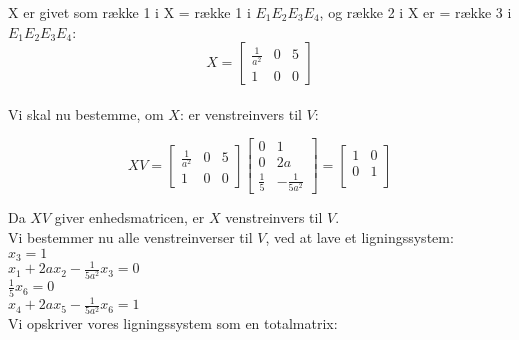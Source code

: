\documentclass[a4paper,12pt]{article}
\begin{document}
X er givet som række 1 i X = række 1 i $E_1 E_2 E_3 E_4$, og række 2 i X er = række 3 i $E_1 E_2 E_3 E_4$:\\
\[
X =
\left[\begin{array}{ccc}
    \frac{1}{a^2} & 0 & 5 \\
    1 & 0 & 0
\end{array}\right]
\]\\

Vi skal nu bestemme, om $X$: er venstreinvers til $V$:

\[
XV = 
\left[\begin{array}{ccc}
    \frac{1}{a^2} & 0 & 5 \\
    1 & 0 & 0
\end{array}\right]
\left[\begin{array}{cc}
    0 & 1 \\
    0 & 2a \\
    \frac{1}{5} & -\frac{1}{5a^2}
\end{array}\right]
=
\left[\begin{array}{cc}
    1 & 0 \\
    0 & 1 \\
\end{array}\right]
\]

Da $XV$ giver enhedsmatricen, er $X$ venstreinvers til $V$.\\

Vi bestemmer nu alle venstreinverser til $V$, ved at lave et ligningssystem:\\
$x_3=1$\\
$x_1+2ax_2-\frac{1}{5a^2}x_3=0$\\
$\frac{1}{5}x_6=0$\\
$x_4+2ax_5-\frac{1}{5a^2}x_6=1$\\

Vi opskriver vores ligningssystem som en totalmatrix:\\
\end{document}

